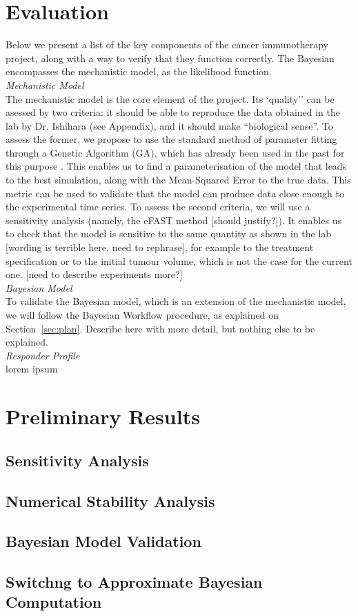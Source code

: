 \documentclass[11pt]{article}
\begin{document}
\section{Evaluation}
Below we present a list of the key components of the cancer immunotherapy project, along with a way to verify that they function correctly. The Bayesian encompasses the mechanistic model, as the likelihood function. \\[11pt]
%
\textit{Mechanistic Model}\\[3pt] %
The mechanistic model is the core element of the project. Its `quality'' can be asessed by two criteria: it should be able to reproduce the data obtained in the lab by Dr. Ishihara (see Appendix), and it should make ``biological sense''. To assess the former, we propose to use the standard method of parameter fitting through a Genetic Algorithm (GA), which has already been used in the past for this purpose \cite{christian2}. This enables us to find a parameterisation of the model that leads to the best simulation, along with the Mean-Squared Error to the true data. This metric can be used to validate that the model can produce data close enough to the experimental time series. To assess the second criteria, we will use a sensitivity analysis (namely, the eFAST method [should justify?]). It enables us to check that the model is sensitive to the same quantity as shown in the lab [wording is terrible here, need to rephrase], for example to the treatment specification or to the initial tumour volume, which is not the case for the current one. [need to describe experiments more?]\\[11pt]
%
\textit{Bayesian Model}\\[3pt]
To validate the Bayesian model, which is an extension of the mechanistic model, we will follow the Bayesian Workflow procedure, as explained on Section~\ref{sec:plan}. Describe here with more detail, but nothing else to be explained.\\[11pt]
%
\iffalse
\textit{Biomarkers}\\[3pt]
lorem ipsum\\[11pt]
%
\fi
\textit{Responder Profile}\\[3pt]
lorem ipsum

\section{Preliminary Results}
\subsection{Sensitivity Analysis}

\subsection{Numerical Stability Analysis}

\subsection{Bayesian Model Validation}

\subsection{Switchng to Approximate Bayesian Computation}

\newpage 
\clearpage
\newpage



\end{document}
